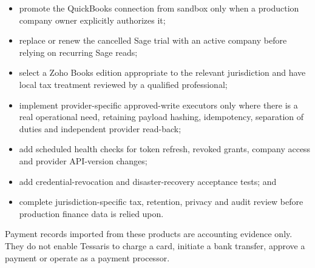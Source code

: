 \begin{itemize}[leftmargin=*]
  \item promote the QuickBooks connection from sandbox only when a production
        company owner explicitly authorizes it;
  \item replace or renew the cancelled Sage trial with an active company before
        relying on recurring Sage reads;
  \item select a Zoho Books edition appropriate to the relevant jurisdiction and
        have local tax treatment reviewed by a qualified professional;
  \item implement provider-specific approved-write executors only where there is
        a real operational need, retaining payload hashing, idempotency,
        separation of duties and independent provider read-back;
  \item add scheduled health checks for token refresh, revoked grants, company
        access and provider API-version changes;
  \item add credential-revocation and disaster-recovery acceptance tests; and
  \item complete jurisdiction-specific tax, retention, privacy and audit review
        before production finance data is relied upon.
\end{itemize}

Payment records imported from these products are accounting evidence only.
They do not enable Tessaris to charge a card, initiate a bank transfer, approve
a payment or operate as a payment processor.

